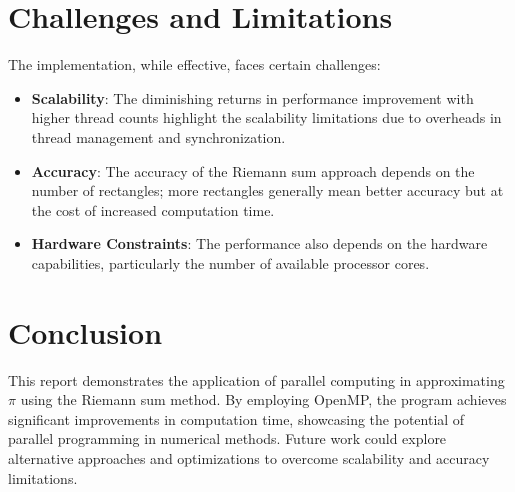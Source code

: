 \documentclass[11pt]{article}
\begin{document}
    \section{Challenges and Limitations}
    The implementation, while effective, faces certain challenges:
    \begin{itemize}
        \item \textbf{Scalability}: The diminishing returns in performance improvement with higher thread counts highlight the scalability limitations due to overheads in thread management and synchronization.
        \item \textbf{Accuracy}: The accuracy of the Riemann sum approach depends on the number of rectangles; more rectangles generally mean better accuracy but at the cost of increased computation time.
        \item \textbf{Hardware Constraints}: The performance also depends on the hardware capabilities, particularly the number of available processor cores.
    \end{itemize}

    \section{Conclusion}
    This report demonstrates the application of parallel computing in approximating $\pi$ using the Riemann sum method. By employing OpenMP, the program achieves significant improvements in computation time, showcasing the potential of parallel programming in numerical methods. Future work could explore alternative approaches and optimizations to overcome scalability and accuracy limitations.
\end{document}
